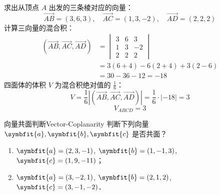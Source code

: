 \begin{solution}
    求出从顶点 $A$ 出发的三条棱对应的向量：
    \begin{equation}
        \overrightarrow{AB} = (3, 6, 3), \quad \overrightarrow{AC} = (1, 3, -2), \quad \overrightarrow{AD} = (2, 2, 2)
    \end{equation}
    计算三向量的混合积：
    \begin{equation}
        \begin{aligned}
            (\overrightarrow{AB}, \overrightarrow{AC}, \overrightarrow{AD}) & = \begin{vmatrix} 3 & 6 & 3 \\ 1 & 3 & -2 \\ 2 & 2 & 2 \end{vmatrix} \\
                                                                            & = 3(6 + 4) - 6(2 + 4) + 3(2 - 6)                                     \\
                                                                            & = 30 - 36 - 12 = -18
        \end{aligned}
    \end{equation}
    四面体的体积 $V$ 为混合积绝对值的 $\frac{1}{6}$：
    \begin{equation}
        V = \frac{1}{6} \left| (\overrightarrow{AB}, \overrightarrow{AC}, \overrightarrow{AD}) \right| = \frac{1}{6} \cdot |-18| = 3
    \end{equation}
    \begin{equation}
        \boxed{V_{ABCD} = 3}
    \end{equation}
\end{solution}


\begin{problem}{向量共面判断}{Vector-Coplanarity}
    判断下列向量 $\symbfit{a}, \symbfit{b}, \symbfit{c}$ 是否共面？
    \begin{enumerate}
        \item $\symbfit{a} = (2, 3, -1)$, $\symbfit{b} = (1, -1, 3)$, $\symbfit{c} = (1, 9, -11)$；
        \item $\symbfit{a} = (3, -2, 1)$, $\symbfit{b} = (2, 1, 2)$, $\symbfit{c} = (3, -1, -2)$．
    \end{enumerate}
\end{problem}

